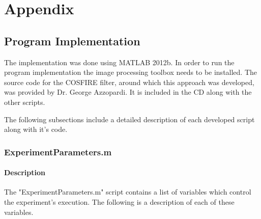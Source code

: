 \appendix
\chapter{Appendix}

\section{Program Implementation}
The implementation was done using MATLAB 2012b. In order to run the program implementation the image processing toolbox needs to be installed. The source code for the COSFIRE filter, around which this approach was developed, was provided \footnotemark by Dr. George Azzopardi. It is included in the CD along with the other scripts. \\


The following subsections include a detailed description of each developed script along with it's code.

\label{sec:built}
\subsection{ExperimentParameters.m}
\subsubsection{Description}
The "ExperimentParameters.m" script contains a list of variables which control the experiment's execution. The following is a description of each of these variables.

